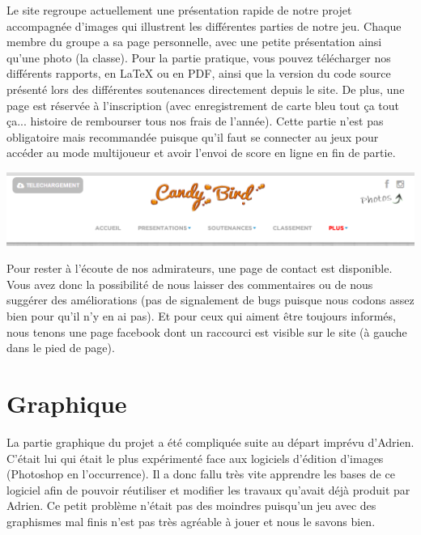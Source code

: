 \documentclass [11pt]{report}
\begin{document}
	Le site regroupe actuellement une présentation rapide de notre projet accompagnée d'images qui illustrent les différentes parties de notre jeu. Chaque membre du groupe a sa page personnelle, avec une petite présentation ainsi qu'une photo (la classe). Pour la partie pratique, vous pouvez télécharger nos différents rapports, en LaTeX ou en PDF, ainsi que la version du code source présenté lors des différentes soutenances directement depuis le site. De plus, une page est réservée à l'inscription (avec enregistrement de carte bleu tout ça tout ça... histoire de rembourser tous nos frais de l'année). Cette partie n'est pas obligatoire mais recommandée puisque qu'il faut se connecter au jeux pour accéder au mode multijoueur et avoir l'envoi de score en ligne en fin de partie.\\
	\vspace{4mm}
	
	\begin{center}
	\includegraphics[scale=0.5]{images/site.png}
	\end{center}
	
	\vspace{10mm}
	
	Pour rester à l'écoute de nos admirateurs, une page de contact est disponible. Vous avez donc la possibilité de nous laisser des commentaires ou de nous suggérer des améliorations (pas de signalement de bugs puisque nous codons assez bien pour qu'il n'y en ai pas). Et pour ceux qui aiment être toujours informés, nous tenons une page facebook dont un raccourci est visible sur le site (à gauche dans le pied de page).
	
	\vspace{10mm}
	
	\newpage
	
	\section{Graphique}
	La partie graphique du projet a été compliquée suite au départ imprévu d'Adrien. C'était lui qui était le plus expérimenté face aux logiciels d'édition d'images (Photoshop en l'occurrence). Il a donc fallu  très vite apprendre les bases de ce logiciel afin de pouvoir réutiliser et modifier les travaux qu'avait déjà produit par Adrien. Ce petit problème n'était pas des moindres puisqu'un jeu avec des graphismes mal finis n'est pas très agréable à jouer et nous le savons bien.
	
\end{document}
